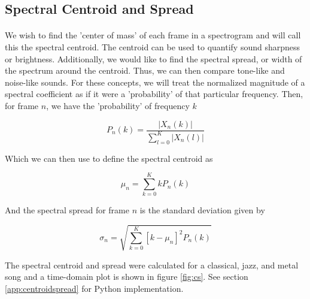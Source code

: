\documentclass[11pt,a4paper]{article}
\begin{document}
\pagebreak

\subsection{Spectral Centroid and Spread}
\paragraph*{} We wish to find the 'center of mass' of each frame in a spectrogram and will call this the spectral centroid. The centroid can be used to quantify sound sharpness or brightness. Additionally, we would like to find the spectral spread, or width of the spectrum around the centroid. Thus, we can then compare tone-like and noise-like sounds. For these concepts, we will treat the normalized magnitude of a spectral coefficient as if it were a 'probability' of that particular frequency. Then, for frame $n$, we have the 'probability' of frequency $k$

\begin{equation} \label{eqn:P}
P_n(k) = \frac{|X_n(k)|}{\sum_{l=0}^{K} |X_n(l)|}
\end{equation}

Which we can then use to define the spectral centroid as

\begin{equation}
\mu_n = \sum_{k=0}^{K} kP_n(k)
\end{equation}

And the spectral spread for frame $n$ is the standard deviation given by

\begin{equation}
\sigma_n = \sqrt{\sum_{k=0}^{K} [k-\mu_n]^2 P_n(k)}
\end{equation}

The spectral centroid and spread were calculated for a classical, jazz, and metal song and a time-domain plot is shown in figure \ref{fig:cs}. See section \ref{app:centroidspread} for Python implementation.

\pagebreak
\end{document}
